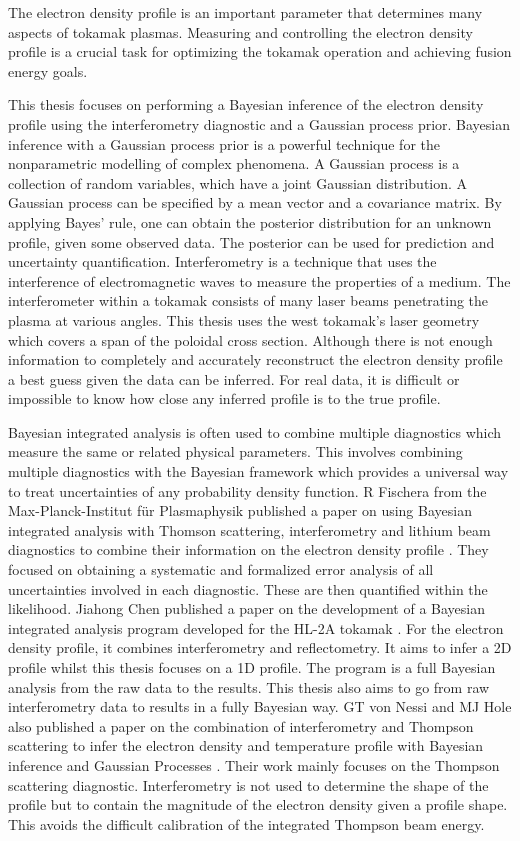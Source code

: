 The electron density profile is an important parameter that determines many aspects of tokamak plasmas. Measuring and controlling the electron density profile is a crucial task for optimizing the tokamak operation and achieving fusion energy goals.

This thesis focuses on performing a Bayesian inference of the electron density profile using the interferometry diagnostic and a Gaussian process prior. Bayesian inference with a Gaussian process prior is a powerful technique for the nonparametric modelling of complex phenomena. A Gaussian process is a collection of random variables, which have a joint Gaussian distribution. A Gaussian process can be specified by a mean vector and a covariance matrix. By applying Bayes’ rule, one can obtain the posterior distribution for an unknown profile, given some observed data. The posterior can be used for prediction and uncertainty quantification. Interferometry is a technique that uses the interference of electromagnetic waves to measure the properties of a medium. The interferometer within a tokamak consists of many laser beams penetrating the plasma at various angles. This thesis uses the \gls{west} tokamak's laser geometry which covers a span of the poloidal cross section. Although there is not enough information to completely and accurately reconstruct the electron density profile a best guess given the data can be inferred. For real data, it is difficult or impossible to know how close any inferred profile is to the true profile.

Bayesian integrated analysis is often used to combine multiple diagnostics which measure the same or related physical parameters. This involves combining multiple diagnostics with the Bayesian framework which provides a universal way to treat uncertainties of any probability density function. R Fischera from the Max-Planck-Institut für Plasmaphysik published a paper on using Bayesian integrated analysis with Thomson scattering, interferometry and lithium beam diagnostics to combine their information on the electron density profile \cite{IDAmaxPlanck}. They focused on obtaining a systematic and formalized error analysis of all uncertainties involved in each diagnostic. These are then quantified within the likelihood. Jiahong Chen published a paper on the development of a Bayesian integrated analysis program developed for the HL-2A tokamak \cite{IDAgeert2023}. For the electron density profile, it combines interferometry and reflectometry. It aims to infer a 2D profile whilst this thesis focuses on a 1D profile. The program is a full Bayesian analysis from the raw data to the results. This thesis also aims to go from raw interferometry data to results in a fully Bayesian way. GT von Nessi and MJ Hole also published a paper on the combination of interferometry and Thompson scattering to infer the electron density and temperature profile with Bayesian inference and Gaussian Processes \cite{nessiIBAmega-ampere-spherical}. Their work mainly focuses on the Thompson scattering diagnostic. Interferometry is not used to determine the shape of the profile but to contain the magnitude of the electron density given a profile shape. This avoids the difficult calibration of the integrated Thompson beam energy.  

